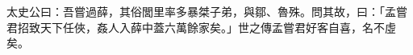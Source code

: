 \begin{pinyinscope}
太史公曰：吾嘗過薛，其俗閭里率多暴桀子弟，與鄒、魯殊。問其故，曰：「孟嘗君招致天下任俠，姦人入薛中蓋六萬餘家矣。」世之傳孟嘗君好客自喜，名不虛矣。


\end{pinyinscope}